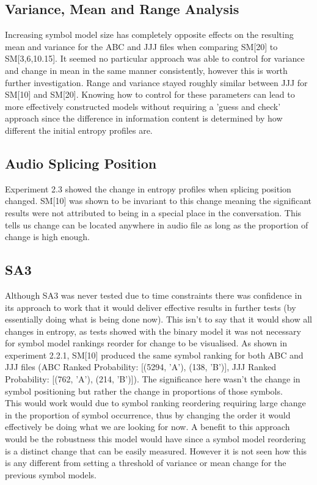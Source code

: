 \subsection{Variance, Mean and Range Analysis}
Increasing symbol model size has completely opposite effects on the resulting mean and variance for the ABC and JJJ files when comparing SM[20] to SM[3,6,10.15]. It seemed no particular approach was able to control for variance and change in mean in the same manner consistently, however this is worth further investigation. Range and variance stayed roughly similar between JJJ for SM[10] and SM[20]. Knowing how to control for these parameters can lead to more effectively constructed models without requiring a 'guess and check' approach since the difference in information content is determined by how different the initial entropy profiles are.

\subsection{Audio Splicing Position}
Experiment 2.3 showed the change in entropy profiles when splicing position changed. SM[10] was shown to be invariant to this change meaning the significant results were not attributed to being in a special place in the conversation. This tells us change can be located anywhere in audio file as long as the proportion of change is high enough.

\subsection{SA3}
Although SA3 was never tested due to time constraints there was confidence in its approach to work that it would deliver effective results in further tests (by essentially doing what is being done now). This isn't to say that it would show all changes in entropy, as tests showed with the binary model it was not necessary for symbol model rankings reorder for change to be visualised. As shown in experiment 2.2.1, SM[10] produced the same symbol ranking for both ABC and JJJ files (ABC Ranked Probability: [(5294, 'A'), (138, 'B')], JJJ Ranked Probability: [(762, 'A'), (214, 'B')]). The significance here wasn't the change in symbol positioning but rather the change in proportions of those symbols.\\

This would work would due to symbol ranking reordering requiring large change in the proportion of symbol occurrence, thus by changing the order it would effectively be doing what we are looking for now. A benefit to this approach would be the robustness this model would have since a symbol model reordering is a distinct change that can be easily measured. However it is not seen how this is any different from setting a threshold of variance or mean change for the previous symbol models. \\

